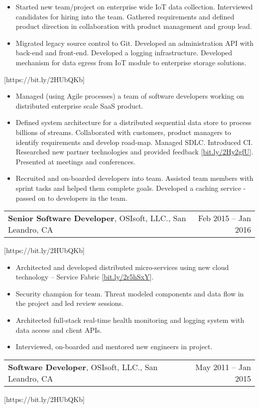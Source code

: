 \documentclass[letterpaper,10pt]{article}
\makeatletter
\newcommand{\experienceItem}[3]{
	\begin{tabular*}{\textwidth}{c@{\extracolsep{\fill}}c}
		\multicolumn{1}{l}{\textbf{#1}, #2} & \multicolumn{1}{r}{#3}\\
	\end{tabular*}\vspace{-10pt}
}
\newcommand{\resumeItemListStart}{\begin{itemize}}
\newcommand{\resumeItemListEnd}{\end{itemize}}
\newcommand{\resumeListItem}[1]{
	\item{#1 \vspace{-6pt}}
}
\makeatother
\begin{document}
	
	\resumeItemListStart
	\resumeListItem {Started new team/project on enterprise wide IoT data collection. Interviewed candidates for hiring into the team. Gathered requirements and defined product direction in collaboration with product management and group lead.}
	\resumeListItem {Migrated legacy source control to Git. Developed an administration API with back-end and front-end. Developed a logging infrastructure. Developed mechanism for data egress from IoT module to enterprise storage solutions.}
	\resumeItemListEnd

	[https://bit.ly/2HUbQKb]
	
	\resumeItemListStart
	\resumeListItem {Managed (using Agile processes) a team of software developers working on distributed enterprise scale SaaS product.}
	\resumeListItem {Defined system architecture for a distributed sequential data store to process billions of streams. Collaborated with customers, product managers to identify requirements and develop road-map. Managed SDLC. Introduced CI. Researched new partner technologies and provided feedback [\href{https://bit.ly/2Hy2gfU}{bit.ly/2Hy2gfU}]. Presented at meetings and conferences.}
	\resumeListItem {Recruited and on-boarded developers into team. Assisted team members with sprint tasks and helped them complete goals. Developed a caching service - passed on to developers in the team.}
	\resumeItemListEnd

	\experienceItem{Senior Software Developer}{OSIsoft, LLC., San Leandro, CA}{Feb 2015 -- Jan 2016}
	
	[https://bit.ly/2HUbQKb]
	
	\resumeItemListStart
	\resumeListItem {Architected and developed distributed micro-services using new cloud technology -- Service Fabric [\href{https://bit.ly/2r5hSxY}{bit.ly/2r5hSxY}].}
	\resumeListItem {Security champion for team. Threat modeled components and data flow in the project and led review sessions.}
	\resumeListItem {Architected full-stack real-time health monitoring and logging system with data access and client APIs.}
	\resumeListItem {Interviewed, on-boarded and mentored new engineers in project.}
	\resumeItemListEnd

	\experienceItem{Software Developer}{OSIsoft, LLC., San Leandro, CA}{May 2011 -- Jan 2015}
	
	[https://bit.ly/2HUbQKb]
\end{document}
